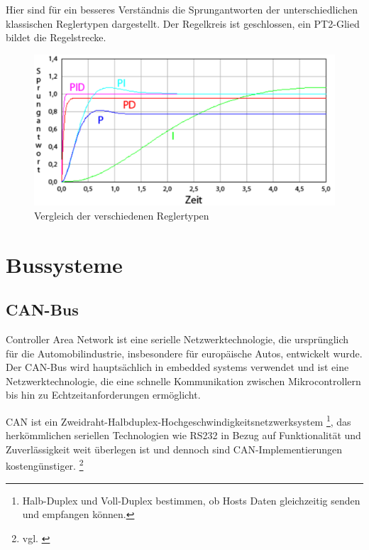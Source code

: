 \vspace{5mm}
Hier sind für ein besseres Verständnis die Sprungantworten der unterschiedlichen klassischen Reglertypen dargestellt. Der Regelkreis ist geschlossen, ein PT2-Glied bildet die Regelstrecke.
\\[4mm]
\begin{figure}[H]
	\begin{center}
		\includegraphics[scale=0.3]{figures/antrieb/Reglertypen.png}
		\caption{Vergleich der verschiedenen Reglertypen \cite{PID-Regler}}
	\end{center}
\end{figure}

\newpage



\section{Bussysteme}

\subsection{CAN-Bus}

Controller Area Network ist eine serielle Netzwerktechnologie, die ursprünglich für die Automobilindustrie, insbesondere für europäische Autos, entwickelt wurde. Der CAN-Bus wird hauptsächlich in embedded systems verwendet und ist eine Netzwerktechnologie, die eine schnelle Kommunikation zwischen Mikrocontrollern bis hin zu Echtzeitanforderungen ermöglicht. \\ \medskip

CAN ist ein Zweidraht-Halbduplex-Hochgeschwindigkeitsnetzwerksystem \footnote{Halb-Duplex und Voll-Duplex bestimmen, ob Hosts Daten gleichzeitig senden und empfangen können.}, das herkömmlichen seriellen Technologien wie RS232 in Bezug auf Funktionalität und Zuverlässigkeit weit überlegen ist und dennoch sind CAN-Implementierungen kostengünstiger. \footnote{vgl. \cite{can}}

